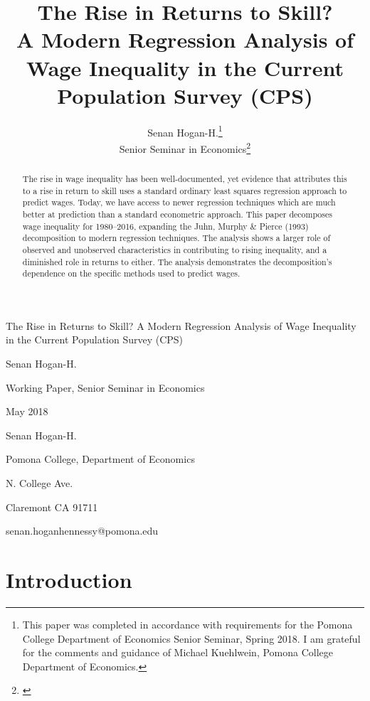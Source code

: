 \documentclass[notitlepage,12pt]{article}
\author{Senan Hogan-H.\footnote{This paper was completed in accordance with requirements for the Pomona College Department of Economics Senior Seminar, Spring 2018.  I am grateful for the comments and guidance of Michael Kuehlwein, Pomona College Department of Economics.} \\ Senior Seminar in Economics\footnote{\href{https://github.com/shoganhennessy/ECON190}{\color{blue}{\underline{This project's Github repository, which hosts all contributing materials, is available here.}}}}}
\title{The Rise in Returns to Skill? \\ \Large{A Modern Regression Analysis of Wage Inequality in the Current Population Survey (CPS)}}
\date{\begin{singlespace} \normalsize{
\vfill Pomona College, Department of Economics \\
\noindent 425 N. College Ave.  \\
\noindent Claremont CA 91711   \\
\noindent May 2018}
\end{singlespace}}
\begin{document}
\maketitle
\thispagestyle{empty}

\newpage \thispagestyle{empty}
\begin{singlespace}
\noindent The Rise in Returns to Skill?  A Modern Regression Analysis of Wage Inequality in the Current Population Survey (CPS)

\noindent Senan Hogan-H.

\noindent Working Paper, Senior Seminar in Economics

\noindent May 2018
\end{singlespace}

\begin{abstract} \noindent
The rise in wage inequality has been well-documented, yet evidence that attributes this to a rise in return to skill uses a standard ordinary least squares regression approach to predict wages.  Today, we have access to newer regression techniques which are much better at prediction than a standard econometric approach.  This paper decomposes wage inequality for 1980--2016, expanding the Juhn, Murphy \& Pierce (1993) decomposition to modern regression techniques.  The analysis shows a larger role of observed and unobserved characteristics in contributing to rising inequality, and a diminished role in returns to either.  The analysis demonstrates the decomposition's dependence on the specific methods used to predict wages.
\end{abstract}
\vfill
\begin{singlespace}
\noindent Senan Hogan-H.

\noindent Pomona College, Department of Economics

 N. College Ave.

\noindent Claremont CA 91711

\noindent senan.hoganhennessy@pomona.edu
\end{singlespace}


\newpage
\setcounter{page}{1}

\section{Introduction}
\end{document}
